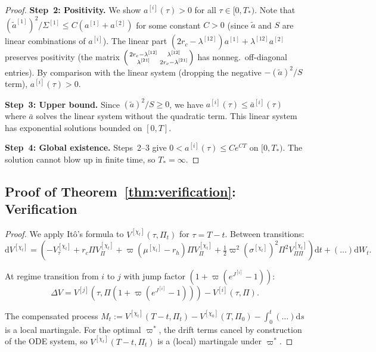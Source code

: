 \documentclass[11pt,a4paper]{article}
\numberwithin{equation}{section}
\newcommand{\dd}{\mathrm{d}}
\begin{document}
\begin{appendices}
\begin{proof}
\textbf{Step~2: Positivity.} We show $a^{[i]}(\tau) > 0$ for all $\tau \in [0, T_*)$. Note that $(\tilde{a}^{[1]})^2/\Sigma^{[1]} \leq C(a^{[1]} + a^{[2]})$ for some constant $C > 0$ (since $\tilde{a}$ and $S$ are linear combinations of $a^{[i]}$). The linear part $(2r_c - \lambda^{[12]})a^{[1]} + \lambda^{[12]} a^{[2]}$ preserves positivity (the matrix $\begin{psmallmatrix} 2r_c-\lambda^{[12]} & \lambda^{[12]} \\ \lambda^{[21]} & 2r_c-\lambda^{[21]} \end{psmallmatrix}$ has nonneg.\ off-diagonal entries). By comparison with the linear system (dropping the negative $-(\tilde{a})^2/S$ term), $a^{[i]}(\tau) > 0$.

\textbf{Step~3: Upper bound.} Since $(\tilde{a})^2/S \geq 0$, we have $a^{[i]}(\tau) \leq \bar{a}^{[i]}(\tau)$ where $\bar{a}$ solves the linear system without the quadratic term. This linear system has exponential solutions bounded on $[0,T]$.

\textbf{Step~4: Global existence.} Steps~2--3 give $0 < a^{[i]}(\tau) \leq C e^{CT}$ on $[0, T_*)$. The solution cannot blow up in finite time, so $T_* = \infty$.
\end{proof}


\subsection{Proof of Theorem~\ref{thm:verification}: Verification}\label{app:verification}

\begin{proof}
We apply It\^o's formula to $V^{[\chi_t]}(\tau, \Pi_t)$ for $\tau = T - t$. Between transitions:
\begin{equation}
\dd V^{[\chi_t]} = \left(-V^{[\chi_t]}_\tau + r_c\Pi V^{[\chi_t]}_\Pi + \varpi(\mu^{[\chi_t]}-r_h)\Pi V^{[\chi_t]}_\Pi + \tfrac{1}{2}\varpi^2(\sigma^{[\chi_t]})^2\Pi^2 V^{[\chi_t]}_{\Pi\Pi}\right)\dd t + (\ldots)\dd W_t.
\end{equation}

At regime transition from $i$ to $j$ with jump factor $(1+\varpi(e^{J^{[i]}}-1))$:
\begin{equation}
\Delta V = V^{[j]}(\tau, \Pi(1+\varpi(e^{J^{[i]}}-1))) - V^{[i]}(\tau, \Pi).
\end{equation}

The compensated process $M_t := V^{[\chi_t]}(T-t, \Pi_t) - V^{[\chi_0]}(T, \Pi_0) - \int_0^t (\ldots) \dd s$ is a local martingale. For the optimal $\varpi^*$, the drift terms cancel by construction of the ODE system, so $V^{[\chi_t]}(T-t, \Pi_t)$ is a (local) martingale under $\varpi^*$.


\end{proof}
\end{appendices}
\end{document}
